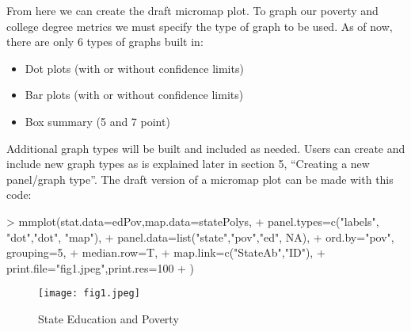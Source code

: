 \documentclass{article}
\begin{document}
From here we can create the draft micromap plot. To graph our poverty and college degree metrics we must specify the type of graph to be used. As of now, there are only 6 types of graphs built in:

\begin{itemize}
  \item Dot plots (with or without confidence limits)
  \item Bar plots (with or without confidence limits)
  \item Box summary (5 and 7 point)  
\end{itemize}

Additional graph types will be built and included as needed. Users can create and include new graph types as is explained later in section 5, ``Creating a new panel/graph type''. The draft version of a micromap plot can be made with this code:

\begin{Schunk}
\begin{Sinput}
> mmplot(stat.data=edPov,map.data=statePolys,
+   panel.types=c("labels", "dot","dot", "map"),
+   panel.data=list("state","pov","ed", NA),
+   ord.by="pov", grouping=5,
+   median.row=T,
+   map.link=c("StateAb","ID"),
+   print.file="fig1.jpeg",print.res=100
+ ) 
\end{Sinput}
\end{Schunk}

\begin{figure}
\begin{center}
\texttt{[image: fig1.jpeg]} 
  \caption{State Education and Poverty} 
  \label{fig1}
\end{center}
\end{figure}
\end{document}
